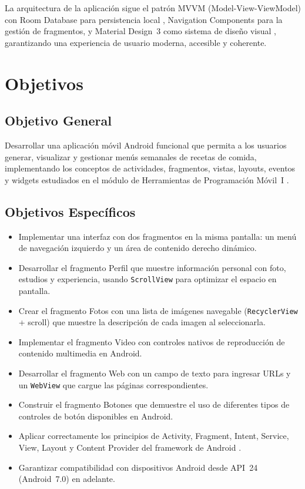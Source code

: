 \documentclass[stu, 12pt, letterpaper, donotrepeattitle, floatsintext, natbib]{apa7}
\begin{document}
La arquitectura de la aplicación sigue el patrón MVVM (Model-View-ViewModel)
con Room Database para persistencia local \citep{androiddevelopers2024room},
Navigation Components para la gestión de fragmentos, y Material Design~3 como sistema
de diseño visual \citep{googlematerial2024}, garantizando una experiencia de usuario
moderna, accesible y coherente.

\section{Objetivos}

\subsection{Objetivo General}

Desarrollar una aplicación móvil Android funcional que permita a los usuarios generar,
visualizar y gestionar menús semanales de recetas de comida, implementando los conceptos
de actividades, fragmentos, vistas, layouts, eventos y widgets estudiados en el módulo
de Herramientas de Programación Móvil~I \citep{girones2013}.

\subsection{Objetivos Específicos}

\begin{itemize}
    \item Implementar una interfaz con dos fragmentos en la misma pantalla: un menú de
    navegación izquierdo y un área de contenido derecho dinámico.
    \item Desarrollar el fragmento Perfil que muestre información personal con foto,
    estudios y experiencia, usando \texttt{ScrollView} para optimizar el espacio en
    pantalla.
    \item Crear el fragmento Fotos con una lista de imágenes navegable
    (\texttt{RecyclerView} + scroll) que muestre la descripción de cada imagen al
    seleccionarla.
    \item Implementar el fragmento Video con controles nativos de reproducción de
    contenido multimedia en Android.
    \item Desarrollar el fragmento Web con un campo de texto para ingresar URLs y un
    \texttt{WebView} que cargue las páginas correspondientes.
    \item Construir el fragmento Botones que demuestre el uso de diferentes tipos de
    controles de botón disponibles en Android.
    \item Aplicar correctamente los principios de Activity, Fragment, Intent, Service,
    View, Layout y Content Provider del framework de Android \citep{benbourahla2015}.
    \item Garantizar compatibilidad con dispositivos Android desde API~24 (Android~7.0)
    en adelante.
\end{itemize}
\end{document}
